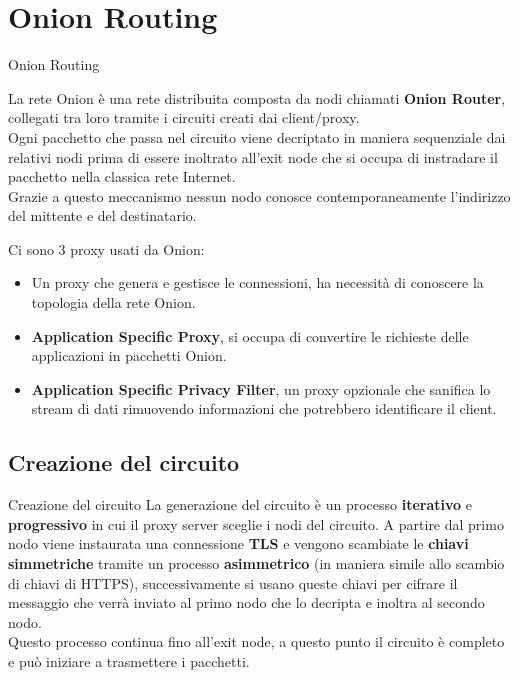 \section{Onion Routing}
\begin{frame}{Onion Routing}
    \begin{figure}[htpb!]
        \centering
        
    \end{figure}
    La rete Onion è una rete distribuita composta da nodi chiamati \textbf{Onion Router}, collegati tra loro tramite i circuiti creati dai client/proxy. \\
    Ogni pacchetto che passa nel circuito viene decriptato in maniera sequenziale dai relativi nodi prima di essere inoltrato all'exit node che si occupa di instradare il pacchetto nella classica rete Internet. \\ 
    Grazie a questo meccanismo nessun nodo conosce contemporaneamente l'indirizzo del mittente e del destinatario.

\end{frame}

\begin{frame}
    Ci sono 3 proxy usati da Onion:
    \begin{itemize}
        \item Un proxy che genera e gestisce le connessioni, ha necessità di conoscere la topologia della rete Onion.
        \item \textbf{Application Specific Proxy}, si occupa di convertire le richieste delle applicazioni in pacchetti Onion.
        \item \textbf{Application Specific Privacy Filter}, un proxy opzionale che sanifica lo stream di dati rimuovendo informazioni che potrebbero identificare il client.
    \end{itemize}
\end{frame}

\subsection{Creazione del circuito}
\begin{frame}{Creazione del circuito}
    La generazione del circuito è un processo \textbf{iterativo} e \textbf{progressivo} in cui il proxy server sceglie i nodi del circuito. A partire dal primo nodo viene instaurata una connessione \textbf{TLS} e vengono scambiate le \textbf{chiavi simmetriche} tramite un processo \textbf{asimmetrico} (in maniera simile allo scambio di chiavi di HTTPS), successivamente si usano queste chiavi per cifrare il messaggio che verrà inviato al primo nodo che lo decripta e inoltra al secondo nodo. \\
    Questo processo continua fino all'exit node, a questo punto il circuito è completo e può iniziare a trasmettere i pacchetti.
\end{frame}
    
